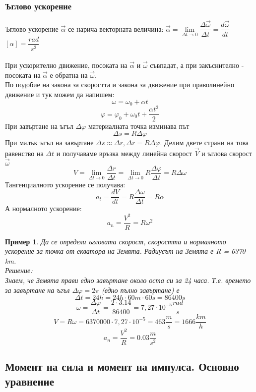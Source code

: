 \documentclass[fleqn]{article}
\newtheorem{example}{Пример}[subsection]
\begin{document}
\subsubsection{Ъглово ускорение}
Ъглово ускорение $\vec{\alpha}$ се нарича векторната величина: $\vec{\alpha} = \lim\limits_{\Delta t \rightarrow 0} \dfrac{\Delta \vec{\omega}}{\Delta t} = \dfrac{d \vec{\omega}}{dt} $ \\
$\left[ \alpha \right] = \dfrac{rad}{s^2}$\\
\\
При ускорително движение, посоката на $\vec{\alpha}$ и $\vec{\omega}$ съвпадат, а при закъснително - посоката на $\vec{\alpha}$ е обратна на $\vec{\omega}$. \\
По подобие на закона за скоростта и закона за движение при праволинейно движение и тук можем да напишем:
$$\omega = \omega_0 + \alpha t$$
$$\varphi = \varphi_0 + \omega_0t + \dfrac{\alpha t^2}{2}$$
При завъртане на ъгъл $\Delta \varphi$ материалната точка изминава път
$$\Delta s = R\Delta \varphi$$
При малък ъгъл на завъртане $\Delta s \approx \Delta r, \Delta r =  R\Delta \varphi$.  Делим двете страни на това равенство на $\Delta t$ и получаваме връзка между линейна скорост $\vec{V}$ и ъглова скорост $\vec{\omega}$
$$V = \lim\limits_{\Delta t \rightarrow 0} \dfrac{\Delta r}{\Delta t} = \lim\limits_{\Delta t \rightarrow 0} R \dfrac{\Delta \varphi}{\Delta t} = R \Delta \omega$$
Тангенциалното ускорение се получава: 
$$a_t = \dfrac{dV}{dt} = R \dfrac{\Delta \omega}{\Delta t} = R \alpha$$
А нормалното ускорение: 
$$a_n = \dfrac{V^2}{R} = R \omega^2$$

\begin{example}
Да се определи ъгловата скорост, скоростта и нормалното ускорение за точка от екватора на Земята. Радиусът на Земята е R = 6370 km.\\
Решение: \\
Знаем, че Земята прави едно завъртане около оста си за 24 часа. Т.е. времето за завъртане на ъгъл $\Delta \varphi = 2 \pi$ (едно пълно завъртане) е 
$$\Delta t = 24h = 24h \cdot 60m \cdot 60s = 86400 s$$
$$\omega =  \dfrac{\Delta \varphi}{\Delta t} =  \dfrac{2 \cdot 3.14}{86400} = 7,27 \cdot 10^{-5} \dfrac{rad}{s}$$
$$V = R\omega = 6370000 \cdot  7,27 \cdot 10^{-5} = 463 \dfrac{m}{s} = 1666 \dfrac{km}{h} $$
$$a_n = \dfrac{V^2}{R} = 0.03 \dfrac{m}{s^2}$$
\end{example}

\subsection{Момент на сила и момент на импулса. Основно уравнение}
\end{document}
